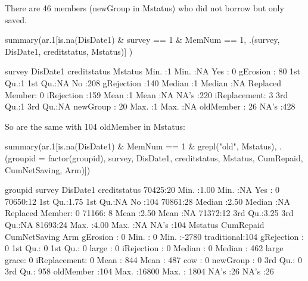 There are 46 members (\textsf{newGroup} in \textsf{Mstatus}) who did not borrow but only saved. 
\begin{Schunk}
\begin{Sinput}
summary(ar.1[is.na(DisDate1) & survey == 1 & MemNum == 1, 
  .(survey, DisDate1, creditstatus, Mstatus)] )
\end{Sinput}
\begin{Soutput}
     survey     DisDate1            creditstatus         Mstatus   
 Min.   :1   Min.   :NA    Yes            :  0   gErosion    : 80  
 1st Qu.:1   1st Qu.:NA    No             :208   gRejection  :140  
 Median :1   Median :NA    Replaced Member:  0   iRejection  :159  
 Mean   :1   Mean   :NA    NA's           :220   iReplacement:  3  
 3rd Qu.:1   3rd Qu.:NA                          newGroup    : 20  
 Max.   :1   Max.   :NA                          oldMember   : 26  
             NA's   :428                                           
\end{Soutput}
\end{Schunk}
So are the same with 104 \textsf{oldMember} in \textsf{Mstatus}:
\begin{Schunk}
\begin{Sinput}
summary(ar.1[is.na(DisDate1) & MemNum == 1 & grepl("old", Mstatus), 
  .(groupid = factor(groupid), survey, DisDate1, creditstatus, 
    Mstatus, CumRepaid, CumNetSaving, Arm)])
\end{Sinput}
\begin{Soutput}
  groupid       survey        DisDate1            creditstatus
 70425:20   Min.   :1.00   Min.   :NA    Yes            :  0  
 70650:12   1st Qu.:1.75   1st Qu.:NA    No             :104  
 70861:28   Median :2.50   Median :NA    Replaced Member:  0  
 71166: 8   Mean   :2.50   Mean   :NA                         
 71372:12   3rd Qu.:3.25   3rd Qu.:NA                         
 81693:24   Max.   :4.00   Max.   :NA                         
                           NA's   :104                        
         Mstatus      CumRepaid      CumNetSaving            Arm     
 gErosion    :  0   Min.   :    0   Min.   :-2780   traditional:104  
 gRejection  :  0   1st Qu.:    0   1st Qu.:    0   large      :  0  
 iRejection  :  0   Median :    0   Median :  462   large grace:  0  
 iReplacement:  0   Mean   :  844   Mean   :  487   cow        :  0  
 newGroup    :  0   3rd Qu.:    0   3rd Qu.:  958                    
 oldMember   :104   Max.   :16800   Max.   : 1804                    
                    NA's   :26      NA's   :26                       
\end{Soutput}
\end{Schunk}
